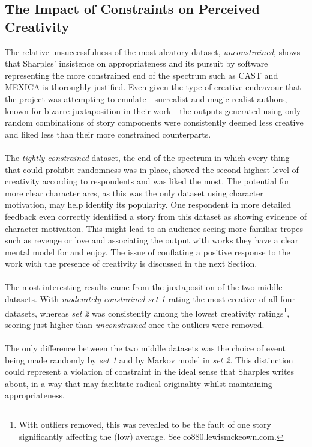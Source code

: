 \documentclass[letterpaper]{article}
\begin{document}
\subsection{The Impact of Constraints on Perceived Creativity}
The relative unsuccessfulness of the most aleatory dataset, \emph{unconstrained}, shows that Sharples' insistence on appropriateness and its pursuit by software representing the more constrained end of the spectrum such as CAST and MEXICA is thoroughly justified. Even given the type of creative endeavour that the project was attempting to emulate - surrealist and magic realist authors, known for bizarre juxtaposition in their work - the outputs generated using only random combinations of story components were consistently deemed less creative and liked less than their more constrained counterparts.\\ 
\\The \emph{tightly constrained} dataset, the end of the spectrum in which every thing that could prohibit randomness was in place, showed the second highest level of creativity according to respondents and was liked the most. The potential for more clear character arcs, as this was the only dataset using character motivation, may help identify its popularity. One respondent in more detailed feedback even correctly identified a story from this dataset as showing evidence of character motivation. This might lead to an audience seeing more familiar tropes such as revenge or love and associating the output with works they have a clear mental model for and enjoy. The issue of conflating a positive response to the work with the presence of creativity is discussed in the next Section.\\
\\The most interesting results came from the juxtaposition of the two middle datasets. With \emph{moderately constrained set 1} rating the most creative of all four datasets, whereas \emph{set 2} was consistently among the lowest creativity ratings\footnote{With outliers removed, this was revealed to be the fault of one story significantly affecting the (low) average. See co880.lewismckeown.com.}, scoring just higher than \emph{unconstrained} once the outliers were removed.\\
\\The only difference between the two middle datasets was the choice of event being made randomly by \emph{set 1} and by Markov model in \emph{set 2}. This distinction could represent a violation of constraint in the ideal sense that Sharples writes about, in a way that may facilitate radical originality whilst maintaining appropriateness.\\
\end{document}
